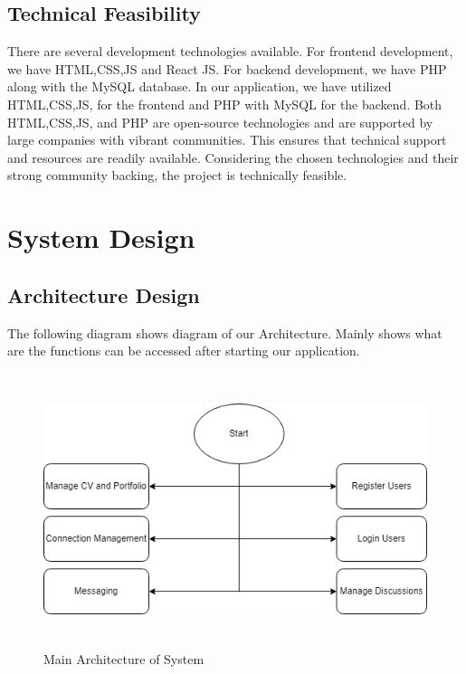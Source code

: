 \subsection{Technical Feasibility}
There are several development technologies available. For frontend development, we have HTML,CSS,JS and React JS. For backend development, we have PHP along with the MySQL database. In our application, we have utilized HTML,CSS,JS, for the frontend and PHP with MySQL for the backend. Both HTML,CSS,JS, and PHP are open-source technologies and are supported by large companies with vibrant communities. This ensures that technical support and resources are readily available. Considering the chosen technologies and their strong community backing, the project is technically feasible.
\newpage
\section{System Design}
\subsection{Architecture Design}
The following diagram shows diagram of our Architecture. Mainly shows what are the functions can be accessed after starting our application.
\begin{figure}[H]
    \includegraphics[height = 8cm]{Diagrams/Main_Block.png}
    \caption{Main Architecture of System}
\end{figure}
\newpage
